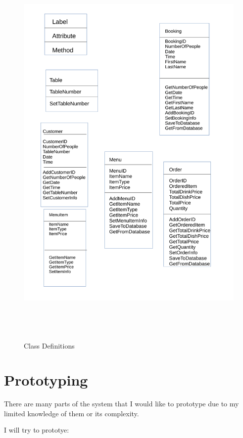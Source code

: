 \begin{figure}[H]
    \includegraphics[height = 20cm]{./Design/Images/ClassDefinitions}
    \caption{Class Definitions} \label{fig:ClassD}
\end{figure}

\section{Prototyping}

There are many parts of the system that I would like to prototype due to my limited knowledge of them or its complexity.  

I will try to prototye:

